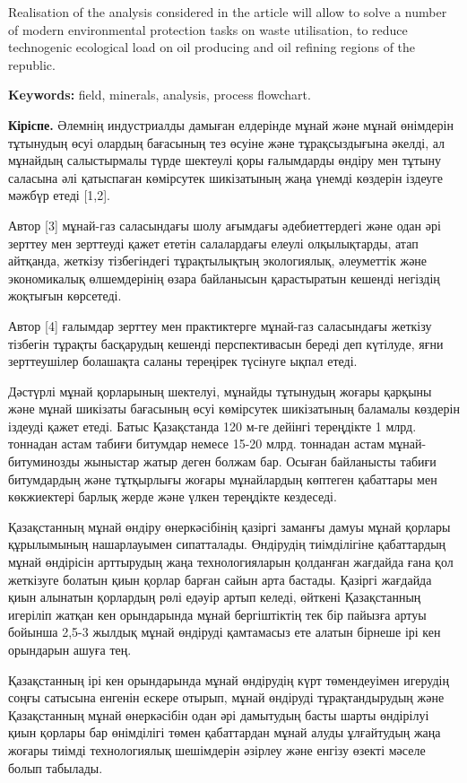 Realisation of the analysis considered in the article will allow to
solve a number of modern environmental protection tasks on waste
utilisation, to reduce technogenic ecological load on oil producing and
oil refining regions of the republic.

{\bfseries Keywords:} field, minerals, analysis, process flowchart.
\begin{multicols}{2}

{\bfseries Кіріспе.} Әлемнің индустриалды дамыған елдерінде мұнай және
мұнай өнімдерін тұтынудың өсуі олардың бағасының тез өсуіне және
тұрақсыздығына әкелді, ал мұнайдың салыстырмалы түрде шектеулі қоры
ғалымдарды өндіру мен тұтыну саласына әлі қатыспаған көмірсутек
шикізатының жаңа үнемді көздерін іздеуге мәжбүр етеді {[}1,2{]}.

Автор {[}3{]} мұнай-газ саласындағы шолу ағымдағы әдебиеттердегі және
одан әрі зерттеу мен зерттеуді қажет ететін салалардағы елеулі
олқылықтарды, атап айтқанда, жеткізу тізбегіндегі тұрақтылықтың
экологиялық, әлеуметтік және экономикалық өлшемдерінің өзара байланысын
қарастыратын кешенді негіздің жоқтығын көрсетеді.

Автор {[}4{]} ғалымдар зерттеу мен практиктерге мұнай-газ саласындағы
жеткізу тізбегін тұрақты басқарудың кешенді перспективасын береді деп
күтілуде, яғни зерттеушілер болашақта саланы тереңірек түсінуге ықпал
етеді.

Дәстүрлі мұнай қорларының шектелуі, мұнайды тұтынудың жоғары қарқыны
және мұнай шикізаты бағасының өсуі көмірсутек шикізатының баламалы
көздерін іздеуді қажет етеді. Батыс Қазақстанда 120 м-ге дейінгі
тереңдікте 1 млрд. тоннадан астам табиғи битумдар немесе 15-20 млрд.
тоннадан астам мұнай-битуминозды жыныстар жатыр деген болжам бар. Осыған
байланысты табиғи битумдардың және тұтқырлығы жоғары мұнайлардың
көптеген қабаттары мен көкжиектері барлық жерде және үлкен тереңдікте
кездеседі.

Қазақстанның мұнай өндіру өнеркәсібінің қазіргі заманғы дамуы мұнай
қорлары құрылымының нашарлауымен сипатталады. Өндірудің тиімділігіне
қабаттардың мұнай өндірісін арттырудың жаңа технологияларын қолданған
жағдайда ғана қол жеткізуге болатын қиын қорлар барған сайын арта
бастады. Қазіргі жағдайда қиын алынатын қорлардың рөлі едәуір артып
келеді, өйткені Қазақстанның игеріліп жатқан кен орындарында мұнай
бергіштіктің тек бір пайызға артуы бойынша 2,5-3 жылдық мұнай өндіруді
қамтамасыз ете алатын бірнеше ірі кен орындарын ашуға тең.

Қазақстанның ірі кен орындарында мұнай өндірудің күрт төмендеуімен
игерудің соңғы сатысына енгенін ескере отырып, мұнай өндіруді
тұрақтандырудың және Қазақстанның мұнай өнеркәсібін одан әрі дамытудың
басты шарты өндірілуі қиын қорлары бар өнімділігі төмен қабаттардан
мұнай алуды ұлғайтудың жаңа жоғары тиімді технологиялық шешімдерін
әзірлеу және енгізу өзекті мәселе болып табылады.


\end{multicols}
